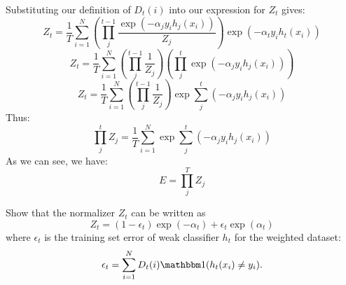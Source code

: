 \begin{solution}
    Substituting our definition of $D_t(i)$ into our expression for $Z_t$ gives:
    \begin{equation}
        Z_t = \frac{1}{T}\sum\limits_{i=1}^N \left(\prod_j^{t-1}\frac{\exp{(-\alpha_jy_ih_j(x_i))}}{Z_j}\right)\exp(-\alpha_{t}y_{i}h_{t}(x_{i}))
    \end{equation}
    \begin{equation}
        Z_t = \frac{1}{T}\sum\limits_{i=1}^N \left(\prod_j^{t-1}\frac{1}{Z_j}\right)\left(\prod_j^{t}\exp{(-\alpha_jy_ih_j(x_i))}\right)
    \end{equation}
    \begin{equation}
        Z_t = \frac{1}{T}\sum\limits_{i=1}^N \left(\prod_j^{t-1}\frac{1}{Z_j}\right)\exp{\sum_j^t\left(-\alpha_jy_ih_j(x_i)\right)}
    \end{equation}
    Thus:
    \begin{equation}
        \prod_j^{t}Z_j=\frac{1}{T}\sum\limits_{i=1}^N\exp{\sum_j^t\left(-\alpha_jy_ih_j(x_i)\right)}
    \end{equation}
    As we can see, we have:
    \begin{equation}
        E = \prod_j^{T}Z_j
    \end{equation}
\end{solution}

\problem[5]
Show that the normalizer $Z_t$ can be written as
\[Z_t = (1 - \epsilon_t) \exp(-\alpha_t) + \epsilon_{t} \exp(\alpha_t)\]
where $\epsilon_t$ is the training set error of weak classifier $h_t$ for the weighted dataset:
\[\epsilon_t = \sum\limits_{i=1}^N D_t(i)\mathbbm1(h_t(x_i) \neq y_i).\]

